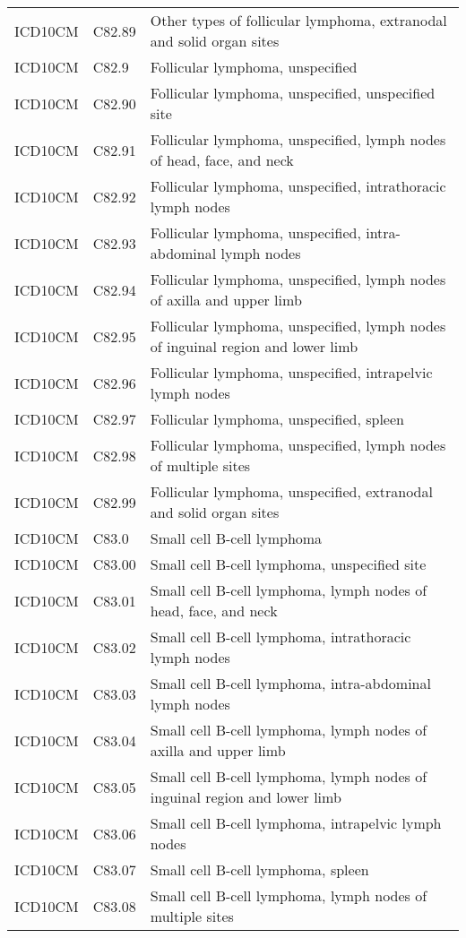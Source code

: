 \begin{table}[ht]
\begin{tabular}{lll}
  ICD10CM & C82.89 & Other types of follicular lymphoma, extranodal and solid organ sites \\ 
  ICD10CM & C82.9 & Follicular lymphoma, unspecified \\ 
  ICD10CM & C82.90 & Follicular lymphoma, unspecified, unspecified site \\ 
  ICD10CM & C82.91 & Follicular lymphoma, unspecified, lymph nodes of head, face, and neck \\ 
  ICD10CM & C82.92 & Follicular lymphoma, unspecified, intrathoracic lymph nodes \\ 
  ICD10CM & C82.93 & Follicular lymphoma, unspecified, intra-abdominal lymph nodes \\ 
  ICD10CM & C82.94 & Follicular lymphoma, unspecified, lymph nodes of axilla and upper limb \\ 
  ICD10CM & C82.95 & Follicular lymphoma, unspecified, lymph nodes of inguinal region and lower limb \\ 
  ICD10CM & C82.96 & Follicular lymphoma, unspecified, intrapelvic lymph nodes \\ 
  ICD10CM & C82.97 & Follicular lymphoma, unspecified, spleen \\ 
  ICD10CM & C82.98 & Follicular lymphoma, unspecified, lymph nodes of multiple sites \\ 
  ICD10CM & C82.99 & Follicular lymphoma, unspecified, extranodal and solid organ sites \\ 
  ICD10CM & C83.0 & Small cell B-cell lymphoma \\ 
  ICD10CM & C83.00 & Small cell B-cell lymphoma, unspecified site \\ 
  ICD10CM & C83.01 & Small cell B-cell lymphoma, lymph nodes of head, face, and neck \\ 
  ICD10CM & C83.02 & Small cell B-cell lymphoma, intrathoracic lymph nodes \\ 
  ICD10CM & C83.03 & Small cell B-cell lymphoma, intra-abdominal lymph nodes \\ 
  ICD10CM & C83.04 & Small cell B-cell lymphoma, lymph nodes of axilla and upper limb \\ 
  ICD10CM & C83.05 & Small cell B-cell lymphoma, lymph nodes of inguinal region and lower limb \\ 
  ICD10CM & C83.06 & Small cell B-cell lymphoma, intrapelvic lymph nodes \\ 
  ICD10CM & C83.07 & Small cell B-cell lymphoma, spleen \\ 
  ICD10CM & C83.08 & Small cell B-cell lymphoma, lymph nodes of multiple sites \\ 

\end{tabular}
\end{table}
